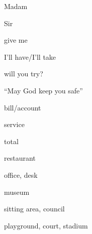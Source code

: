 \begin{flashcard}{\LARGE Madam}
\LARGE {}
\end{flashcard}
\begin{flashcard}{\LARGE Sir}
\LARGE {}
\end{flashcard}
\begin{flashcard}{\LARGE give me}
\LARGE {}
\end{flashcard}
\begin{flashcard}{\LARGE I'll have/I'll take}
\LARGE {}
\end{flashcard}
\begin{flashcard}{\LARGE will you try?}
\LARGE {}
\end{flashcard}
\begin{flashcard}{\LARGE ``May God keep you safe''}
\LARGE {}
\end{flashcard}
\begin{flashcard}{\LARGE bill/account}
\LARGE {}
\end{flashcard}
\begin{flashcard}{\LARGE service}
\LARGE {}
\end{flashcard}
\begin{flashcard}{\LARGE total}
\LARGE {}
\end{flashcard}
\begin{flashcard}{\LARGE restaurant}
\LARGE {}
\end{flashcard}
\begin{flashcard}{\LARGE office, desk}
\LARGE {}
\end{flashcard}
\begin{flashcard}{\LARGE museum}
\LARGE {}
\end{flashcard}
\begin{flashcard}{\LARGE sitting area, council}
\LARGE {}
\end{flashcard}
\begin{flashcard}{\LARGE playground, court, stadium}
\LARGE {}
\end{flashcard}
